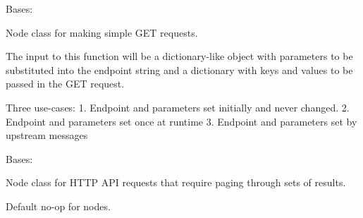 \documentclass[letterpaper,10pt,english]{sphinxmanual}
\begin{document}
\begin{fulllineitems}
\label{\detokenize{api:nanostream.node_classes.network_nodes.HttpGetRequest}}
Bases: {\hyperref[\detokenize{api:nanostream.node.NanoNode}]{}}

Node class for making simple GET requests.

\begin{fulllineitems}
\label{\detokenize{api:nanostream.node_classes.network_nodes.HttpGetRequest.process_item}}
The input to this function will be a dictionary-like object with
parameters to be substituted into the endpoint string and a
dictionary with keys and values to be passed in the GET request.

Three use-cases:
1. Endpoint and parameters set initially and never changed.
2. Endpoint and parameters set once at runtime
3. Endpoint and parameters set by upstream messages

\end{fulllineitems}


\end{fulllineitems}


\begin{fulllineitems}
\label{\detokenize{api:nanostream.node_classes.network_nodes.HttpGetRequestPaginator}}
Bases: {\hyperref[\detokenize{api:nanostream.node.NanoNode}]{}}

Node class for HTTP API requests that require paging through sets of
results.

\begin{fulllineitems}
\label{\detokenize{api:nanostream.node_classes.network_nodes.HttpGetRequestPaginator.process_item}}
Default no-op for nodes.

\end{fulllineitems}


\end{fulllineitems}
\end{document}
